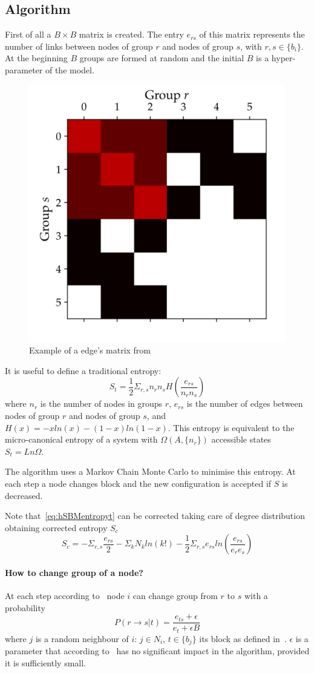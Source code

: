 \subsection{Algorithm}
First of all a $B\times B$ matrix is created. The entry $e_{rs}$ of this matrix represents the number of links between nodes of group $r$ and nodes of group $s$, with $r,s\in\{b_i\}$. At the beginning $B$ groups are formed at random and the initial $B$ is a hyper-parameter of the model.
\begin{figure}[htb!]
  \centering
  \includegraphics[width=0.3\linewidth]{pictures/topic/peixioto_ers.pdf}
  \caption{Example of a edge's matrix from~\cite{peixoto_graph-tool_2014}}
    \label{fig:hsbm-ers}
\end{figure}

It is useful to define a traditional entropy:
\begin{equation}\label{eq:hSBMentropyt}
  S_t=\frac{1}{2}\Sigma_{r,s} n_rn_sH\left(\frac{e_{rs}}{n_rn_s}\right)
\end{equation}
where $n_{r}$ is the number of nodes in groups $r$, $e_{rs}$ is the
number of edges between nodes of group $r$ and nodes of group $s$, and
$H(x)=-xln(x)-(1-x)ln(1-x)$. This entropy is equivalent to the micro-canonical
entropy of a system with ${\Omega(A,\{n_r\})}$ accessible states $S_t=Ln\Omega$.

The algorithm uses a Markov Chain Monte Carlo to minimise this entropy.
At each step a node changes block and the new configuration is accepted if $S$ is decreased.

Note that~\ref{eq:hSBMentropyt} can be corrected taking care of degree
distribution obtaining corrected entropy $S_c$
\begin{equation}
  S_c=-\Sigma_{r,s}\frac{e_{rs}}{2}-\Sigma_k
  N_kln(k!)-\frac{1}{2}\Sigma_{r,s}e_{rs}ln\left(\frac{e_{rs}}{e_re_s}\right)
\end{equation}

\paragraph{How to change group of a node?}
At each step according to~\cite{peixoto2014efficient} node $i$ can change group from $r$ to $s$ with a probability
\begin{equation}\label{eq:Prst}
  P(r\to s|t)=\frac{e_{ts}+\epsilon}{e_t+\epsilon B}
\end{equation}
where $j$ is a random neighbour of $i$: $j\in N_i$, $t\in\{b_j\}$ its block as defined in~\cite{peixoto2014efficient}.
$\epsilon$ is a parameter that according to~\cite{peixoto2017nonparametric} has no significant impact in the algorithm,
provided it is sufficiently small.

